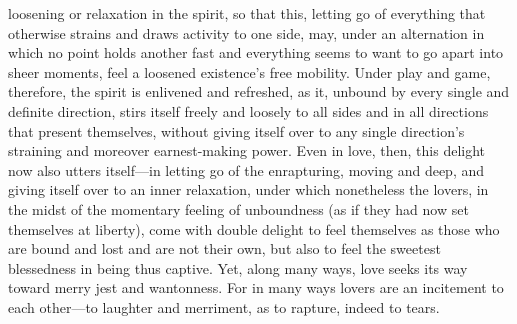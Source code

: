 \documentclass[12pt,a4paper]{book}
\begin{document}
loosening or relaxation in the spirit, so that this, letting go of
everything that otherwise strains and draws activity to one side, may,
under an alternation in which no point holds another fast and everything
seems to want to go apart into sheer moments, feel a loosened existence's
free mobility. Under play and game, therefore, the spirit is enlivened and
refreshed, as it, unbound by every single and definite direction, stirs
itself freely and loosely to all sides and in all directions that present
themselves, without giving itself over to any single direction's straining
and moreover earnest-making power. Even in love, then, this delight now also
utters itself---in letting go of the enrapturing, moving and deep, and
giving itself over to an inner relaxation, under which nonetheless the
lovers, in the midst of the momentary feeling of unboundness (as if they
had now set themselves at liberty), come with double delight to feel
themselves as those who are bound and lost and are not their own, but also
to feel the sweetest blessedness in being thus captive. Yet, along many
ways, love seeks its way toward merry jest and wantonness. For in many ways
lovers are an incitement to each other---to laughter and merriment, as to
rapture, indeed to tears.
\end{document}
